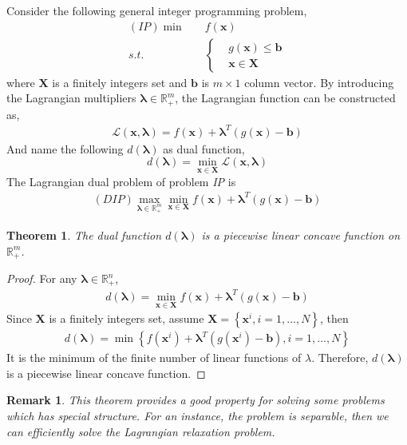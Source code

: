 \documentclass{article}
\newtheorem{thm}{Theorem}
\newtheorem{remark}{Remark}
\begin{document}
 Consider the following general integer programming problem,
 \begin{align}
 	(\textit{IP}) \min \quad & f(\bm{x}) \\
	s.t. \quad & \left\{ 
	\begin{aligned}
	& g(\bm{x}) \leq \bm{b} \\
	& \bm{x} \in \bm{X} 
	\end{aligned} \right.
 \end{align} 
 where $\bm{X}$ is a finitely integers set and $\bm{b}$ is $m \times 1$ column vector. By introducing the Lagrangian multipliers $\bm{\lambda} \in \mathbb{R}_+^m$, the Lagrangian function can be constructed as, 
 \begin{align}
 \mathcal{L}(\bm{x}, \bm{\lambda}) = f(\bm{x}) + \bm{\lambda}^T(g(\bm{x}) - \bm{b})
 \end{align}
 And name the following $d(\bm{\lambda})$ as dual function,
 \begin{equation}
 d(\bm{\lambda}) = \min_{\bm{x} \in \bm{X}} 	\mathcal{L}(\bm{x}, \bm{\lambda})
 \end{equation}
The Lagrangian dual problem of problem \textit{IP} is
 \begin{align}
	(DIP) \max_{\bm{\lambda} \in \mathbb{R}_+^m} \min_{\bm{x} \in \bm{X}} f(\bm{x}) + \bm{\lambda}^T(g(\bm{x}) - \bm{b})
 \end{align}
 
 \begin{thm}
 	The dual function $d(\bm{\lambda})$ is a piecewise linear concave function on $\mathbb{R}_+^m$.
 \end{thm}
 
 \begin{proof}
 	For any $\bm{\lambda} \in \mathbb{R}_+^n$,
 	\begin{align}
 	d(\bm{\lambda}) = \min_{\bm{x} \in \bm{X}} f(\bm{x}) + \bm{\lambda}^T(g(\bm{x}) - \bm{b}) 
 	\end{align}
 	Since $\bm{X}$ is a finitely integers set, assume $\bm{X} = \left\{\bm{x}^i, i = 1, ..., N\right\}$, then
 	\begin{align}
 	d(\bm{\lambda}) = \min \left\{f(\bm{x}^i) + \bm{\lambda}^T(g(\bm{x}^i) - \bm{b}), i = 1, ..., N \right\}
 	\end{align}
 	It is the minimum of the finite number of linear functions of $\lambda$. Therefore, $d(\bm{\lambda})$ is a piecewise linear concave function.
 \end{proof}
 
\begin{remark}
	This theorem provides a good property for solving some problems which has special structure. For an instance, the problem is separable, then we can efficiently solve the Lagrangian relaxation problem. 
\end{remark} 
 
\end{document}
